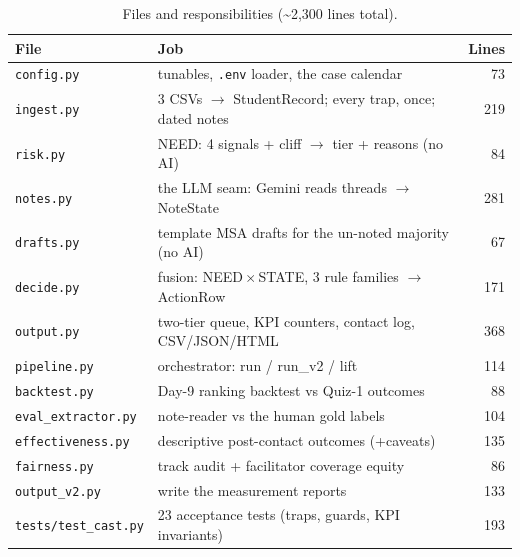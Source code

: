 \documentclass[11pt,paper=a4,parskip=half,DIV=11]{scrartcl}
\begin{document}
\begin{table}[h]\centering\footnotesize
\caption{Files and responsibilities (\textasciitilde2{,}300 lines total).}
\begin{tabular}{llr}
\toprule
File & Job & Lines \\
\midrule
\texttt{config.py} & tunables, \texttt{.env} loader, the case calendar & 73 \\
\texttt{ingest.py} & 3 CSVs $\rightarrow$ StudentRecord; every trap, once; dated notes & 219 \\
\texttt{risk.py} & NEED: 4 signals + cliff $\rightarrow$ tier + reasons (no AI) & 84 \\
\texttt{notes.py} & the LLM seam: Gemini reads threads $\rightarrow$ NoteState & 281 \\
\texttt{drafts.py} & template MSA drafts for the un-noted majority (no AI) & 67 \\
\texttt{decide.py} & fusion: NEED\,$\times$\,STATE, 3 rule families $\rightarrow$ ActionRow & 171 \\
\texttt{output.py} & two-tier queue, KPI counters, contact log, CSV/JSON/HTML & 368 \\
\texttt{pipeline.py} & orchestrator: run / run\_v2 / lift & 114 \\
\texttt{backtest.py} & Day-9 ranking backtest vs Quiz-1 outcomes & 88 \\
\texttt{eval\_extractor.py} & note-reader vs the human gold labels & 104 \\
\texttt{effectiveness.py} & descriptive post-contact outcomes (+caveats) & 135 \\
\texttt{fairness.py} & track audit + facilitator coverage equity & 86 \\
\texttt{output\_v2.py} & write the measurement reports & 133 \\
\texttt{tests/test\_cast.py} & 23 acceptance tests (traps, guards, KPI invariants) & 193 \\
\bottomrule
\end{tabular}
\end{table}
\end{document}
